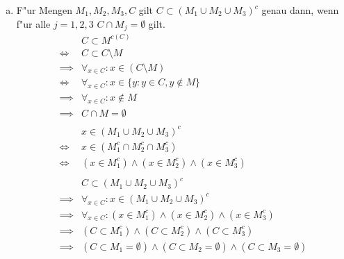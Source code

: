 \begin{enumerate}[(a)]
    \item F"ur Mengen $M_1, M_2, M_3, C$ gilt $C \subset (M_1 \cup M_2 \cup
        M_3)^c$ genau dann, wenn f"ur alle $j = 1, 2, 3$ $C \cap M_j = \emptyset$
        gilt.
        \begin{align*}
                 &C \subset M^{c(C)} \\
            \iff &C \subset C \setminus M \\
            \implies &\forall_{x \in C} : x \in (C \setminus M) \\
            \iff &\forall_{x \in C} : x \in \{y : y \in C, y \notin M \} \\
            \implies &\forall_{x \in C} : x \notin M \\
            \implies &C \cap M = \emptyset \\
            \\
                 &x \in (M_1 \cup M_2 \cup M_3)^c \\
            \iff &x \in (M_1^c \cap M_2^c \cap M_3^c) \\
            \iff &(x \in M_1^c) \land (x \in M_2^c) \land (x \in M_3^c) \\
            \\
                     &C \subset (M_1 \cup M_2 \cup M_3)^c \\
            \implies &\forall_{x \in C} : x \in (M_1 \cup M_2 \cup M_3)^c \\
            \implies &\forall_{x \in C} : (x \in M_1^c) \land (x \in M_2^c) \land (x \in M_3^c) \\
            \implies &(C \subset M_1^c) \land (C \subset M_2^c) \land (C \subset M_3^c) \\
            \implies &(C \subset M_1 = \emptyset) \land (C \subset M_2 = \emptyset) \land (C \subset M_3 = \emptyset)
        \end{align*}
\end{enumerate}
